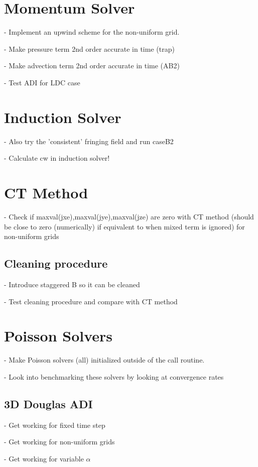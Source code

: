 \documentclass[11pt]{article}
\begin{document}
\section{Momentum Solver}

- Implement an upwind scheme for the non-uniform grid.

- Make pressure term 2nd order accurate in time (trap)

- Make advection term 2nd order accurate in time (AB2)

- Test ADI for LDC case


\section{Induction Solver}

- Also try the 'consistent' fringing field and run caseB2

- Calculate cw in induction solver!

\section{CT Method}

- Check if maxval(jxe),maxval(jye),maxval(jze) are zero with CT method (should be
  close to zero (numerically) if equivalent to when mixed term is ignored) for non-uniform grids


\subsection{Cleaning procedure}
- Introduce staggered B so it can be cleaned

- Test cleaning procedure and compare with CT method

\section{Poisson Solvers}
- Make Poisson solvers (all) initialized outside of the call routine.

- Look into benchmarking these solvers by looking at convergence rates

\subsection{3D Douglas ADI}
- Get working for fixed time step

- Get working for non-uniform grids

- Get working for variable $\alpha$
\end{document}
